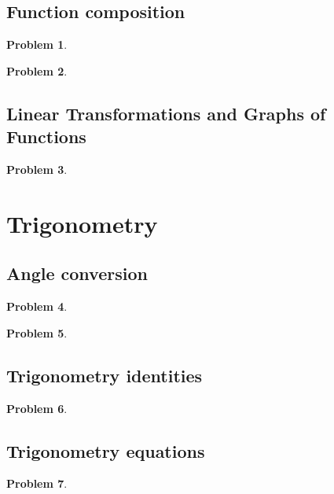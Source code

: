 \documentclass{article}
\newtheorem{problem}{Problem}
\begin{document}
\subsection{Function composition}
\begin{problem}

\end{problem}
\begin{problem}

\end{problem}
\subsection{Linear Transformations and Graphs of Functions}
\begin{problem}

\end{problem}


\section{Trigonometry}
\subsection{Angle conversion}
\begin{problem}

\end{problem}
\begin{problem}

\end{problem}
\subsection{Trigonometry identities}
\begin{problem}

\end{problem}

\subsection{Trigonometry equations}
\begin{problem}

\end{problem}

\end{document}
